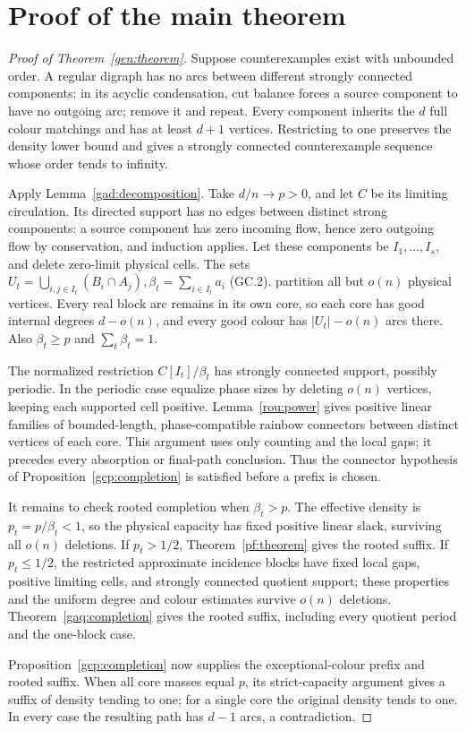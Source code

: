 \section{Proof of the main theorem}\label{gen:section}
\begin{proof}[Proof of Theorem~\ref{gen:theorem}]
Suppose counterexamples exist with unbounded order. A regular digraph has no arcs between different strongly connected components: in its acyclic condensation, cut balance forces a source component to have no outgoing arc; remove it and repeat. Every component inherits the $d$ full colour matchings and has at least $d+1$ vertices. Restricting to one preserves the density lower bound and gives a strongly connected counterexample sequence whose order tends to infinity.

Apply Lemma~\ref{gad:decomposition}. Take $d/n\to{}p>0$, and let $C$ be its limiting circulation. Its directed support has no edges between distinct strong components: a source component has zero incoming flow, hence zero outgoing flow by conservation, and induction applies. Let these components be $I_1,\ldots,I_s$, and delete zero-limit physical cells. The sets $U_t=\bigcup_{i,j\in{}I_t}(B_i\cap{}A_j),\beta_t=\sum_{i\in{}I_t}a_i$ \textup{(GC.2)}. partition all but $o(n)$ physical vertices. Every real block arc remains in its own core, so each core has good internal degrees $d-o(n)$, and every good colour has $|U_t|-o(n)$ arcs there. Also $\beta_t\ge{}p$ and $\sum_t\beta_t=1$.

The normalized restriction $C[I_t]/\beta_t$ has strongly connected support, possibly periodic. In the periodic case equalize phase sizes by deleting $o(n)$ vertices, keeping each supported cell positive. Lemma~\ref{rou:power} gives positive linear families of bounded-length, phase-compatible rainbow connectors between distinct vertices of each core. This argument uses only counting and the local gaps; it precedes every absorption or final-path conclusion. Thus the connector hypothesis of Proposition~\ref{gcp:completion} is satisfied before a prefix is chosen.

It remains to check rooted completion when $\beta_t>p$. The effective density is $p_t=p/\beta_t<1$, so the physical capacity has fixed positive linear slack, surviving all $o(n)$ deletions. If $p_t>1/2$, Theorem~\ref{pf:theorem} gives the rooted suffix. If $p_t\le1/2$, the restricted approximate incidence blocks have fixed local gaps, positive limiting cells, and strongly connected quotient support; these properties and the uniform degree and colour estimates survive $o(n)$ deletions. Theorem~\ref{gaq:completion} gives the rooted suffix, including every quotient period and the one-block case.

Proposition~\ref{gcp:completion} now supplies the exceptional-colour prefix and rooted suffix. When all core masses equal $p$, its strict-capacity argument gives a suffix of density tending to one; for a single core the original density tends to one. In every case the resulting path has $d-1$ arcs, a contradiction.
\end{proof}

